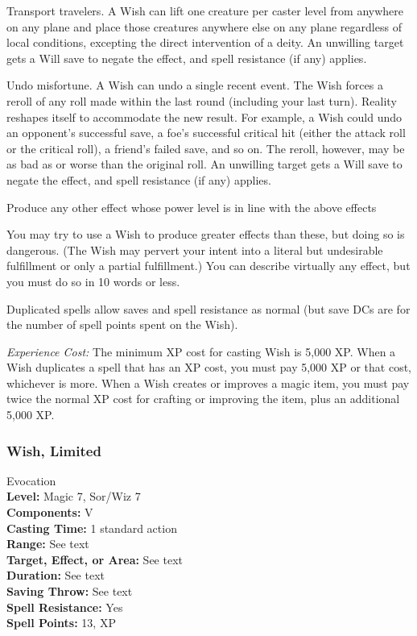 \begin{list}{}{\leftmargin=1em}
  \item Transport travelers. A Wish can lift one creature per caster level from anywhere on any plane and place those creatures anywhere else on any plane regardless of local conditions, 
  excepting the direct intervention of a deity. 
  An unwilling target gets a Will save to negate the effect, and spell resistance (if any) applies.
  \item Undo misfortune. A Wish can undo a single recent event. 
  The Wish forces a reroll of any roll made within the last round (including your last turn). 
  Reality reshapes itself to accommodate the new result. 
  For example, a Wish could undo an opponent's successful save, a foe's successful critical hit (either the attack roll or the critical roll), 
  a friend's failed save, and so on. The reroll, however, may be as bad as or worse than the original roll. 
  An unwilling target gets a Will save to negate the effect, and spell resistance (if any) applies.
  \item Produce any other effect whose power level is in line with the above effects
\end{list}
You may try to use a Wish to produce greater effects than these, but doing so is dangerous. 
(The Wish may pervert your intent into a literal but undesirable fulfillment or only a partial fulfillment.)
You can describe virtually any effect, but you must do so in 10 words or less.

Duplicated spells allow saves and spell resistance as normal (but save DCs are for the number of spell points spent on the Wish).

\emph{Experience Cost:} The minimum XP cost for casting Wish is 5,000 XP. 
When a Wish duplicates a spell that has an XP cost, you must pay 5,000 XP or that cost, whichever is more. 
When a Wish creates or improves a magic item, you must pay twice the normal XP cost for crafting or improving the item, plus an additional 5,000 XP. 

\subsubsection[Limited Wish]{Wish, Limited}
\label{Spell:LimitedWish}
Evocation
\\ \textbf{Level:} Magic 7, Sor/Wiz 7
\\ \textbf{Components:} V
\\ \textbf{Casting Time:} 1 standard action
\\ \textbf{Range:} See text
\\ \textbf{Target, Effect, or Area:} See text
\\ \textbf{Duration:} See text
\\ \textbf{Saving Throw:} See text
\\ \textbf{Spell Resistance:} Yes
\\ \textbf{Spell Points:} 13, XP

